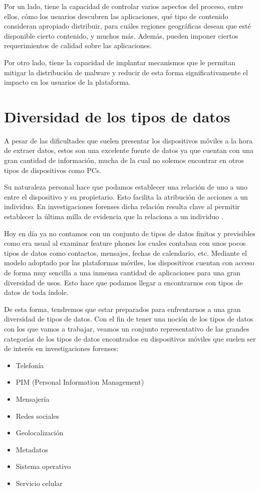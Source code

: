 Por un lado, tiene la capacidad de controlar varios aspectos del proceso, entre ellos, cómo los usuarios descubren las aplicaciones, qué tipo de contenido consideran apropiado distribuir, para cuáles regiones geográficas desean que esté disponible cierto contenido, y muchos más. Además, pueden imponer ciertos requerimientos de calidad sobre las aplicaciones.

Por otro lado, tiene la capacidad de implantar mecanismos que le permitan mitigar la distribución de malware y reducir de esta forma significativamente el impacto en los usuarios de la plataforma.

\section{Diversidad de los tipos de datos}
A pesar de las dificultades que suelen presentar los dispositivos móviles a la hora de extraer datos, estos son una excelente fuente de datos ya que cuentan con una gran cantidad de información, mucha de la cual no solemos encontrar en otros tipos de dispositivos como PCs. 

Su naturaleza personal hace que podamos establecer una relación de uno a uno entre el dispositivo y su propietario. Esto facilita la atribución de acciones a un individuo. En investigaciones forenses dicha relación resulta clave al permitir establecer la última milla de evidencia que la relaciona a un individuo \cite{chapter20}.

Hoy en día ya no contamos con un conjunto de tipos de datos finitos y previsibles como era usual al examinar feature phones los cuales contaban con unos pocos tipos de datos como contactos, mensajes, fechas de calendario, etc. Mediante el modelo adoptado por las plataformas móviles, los dispositivos cuentan con acceso de forma muy sencilla a una inmensa cantidad de aplicaciones para una gran diversidad de usos. Esto hace que podamos llegar a encontrarnos con tipos de datos de toda índole.

De esta forma, tendremos que estar preparados para enfrentarnos a una gran diversidad de tipos de datos. Con el fin de tener una noción de los tipos de datos con los que vamos a trabajar, veamos un conjunto representativo de las grandes categorías de los tipos de datos encontrados en dispositivos móviles que suelen ser de interés en investigaciones forenses:

\begin{itemize}
\item Telefonía
\item PIM (Personal Information Management)
\item Mensajería
\item Redes sociales
\item Geolocalización
\item Metadatos
\item Sistema operativo
\item Servicio celular
\end{itemize}

